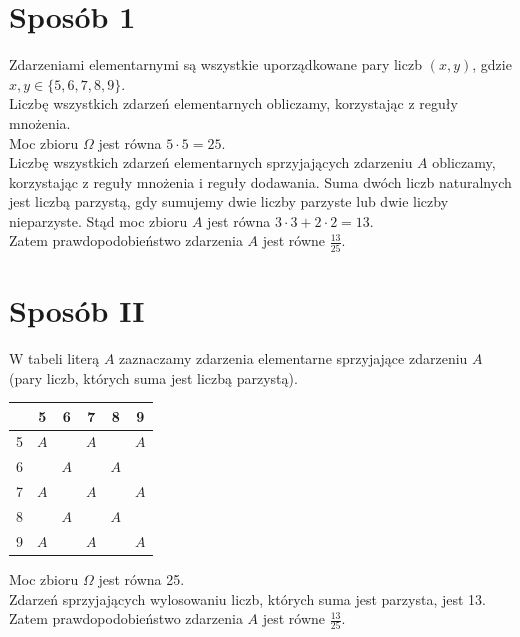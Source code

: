 \documentclass[10pt]{article}
\begin{document}
\section*{Sposób 1}
Zdarzeniami elementarnymi są wszystkie uporządkowane pary liczb $(x, y)$, gdzie $x, y \in\{5,6,7,8,9\}$.\\
Liczbę wszystkich zdarzeń elementarnych obliczamy, korzystając z reguły mnożenia.\\
Moc zbioru $\Omega$ jest równa $5 \cdot 5=25$.\\
Liczbę wszystkich zdarzeń elementarnych sprzyjających zdarzeniu $A$ obliczamy, korzystając z reguły mnożenia i reguły dodawania. Suma dwóch liczb naturalnych jest liczbą parzystą, gdy sumujemy dwie liczby parzyste lub dwie liczby nieparzyste. Stąd moc zbioru $A$ jest równa $3 \cdot 3+2 \cdot 2=13$.\\
Zatem prawdopodobieństwo zdarzenia $A$ jest równe $\frac{13}{25}$.

\section*{Sposób II}
W tabeli literą $A$ zaznaczamy zdarzenia elementarne sprzyjające zdarzeniu $A$ (pary liczb, których suma jest liczbą parzystą).

\begin{center}
\begin{tabular}{|c|c|c|c|c|c|}
\hline
 & 5 & 6 & 7 & 8 & 9 \\
\hline
5 & $A$ &  & $A$ &  & $A$ \\
\hline
6 &  & $A$ &  & $A$ &  \\
\hline
7 & $A$ &  & $A$ &  & $A$ \\
\hline
8 &  & $A$ &  & $A$ &  \\
\hline
9 & $A$ &  & $A$ &  & $A$ \\
\hline
\end{tabular}
\end{center}

Moc zbioru $\Omega$ jest równa 25.\\
Zdarzeń sprzyjających wylosowaniu liczb, których suma jest parzysta, jest 13.\\
Zatem prawdopodobieństwo zdarzenia $A$ jest równe $\frac{13}{25}$.
\end{document}
